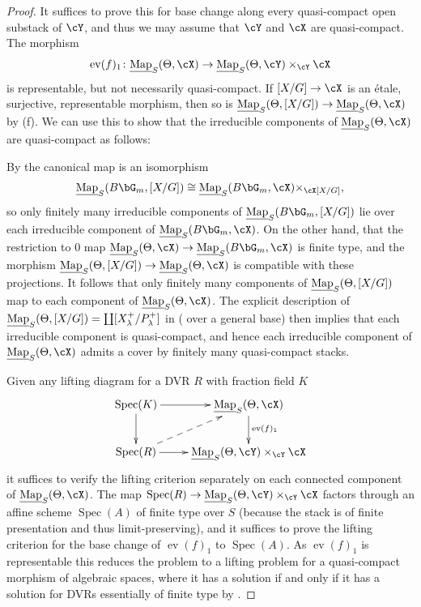 \documentclass[a4paper]{amsart}
\numberwithin{equation}{section}
\theoremstyle{plain}
\theoremstyle{definition}
\DeclareMathOperator{\Spec}{Spec}
\DeclareMathOperator{\ev}{ev}
\newcommand{\uMap}{\underline{{\rm Map}}}
\begin{document}
\begin{proof}
It suffices to prove this for base change along every quasi-compact open substack of $\cY$, and thus we may assume that $\cY$ and $\cX$ are quasi-compact. The morphism $$\ev(f)_1 \colon \uMap_S(\Theta,\cX) \to \uMap_S(\Theta,\cY) \times_{\cY} \cX$$ is representable, but not necessarily quasi-compact. If $[X/G] \to \cX$ is an \'etale, surjective, representable morphism, then so is $\uMap_S(\Theta,[X/G]) \to \uMap_S(\Theta,\cX)$ by (f). We can use this to show that the irreducible components of $\uMap_S(\Theta,\cX)$ are quasi-compact as follows:

By \cite[Cor.~1.1.7]{hlinstability} the canonical map is an isomorphism
\[
\uMap_S(B\bG_m,[X/G]) \cong \uMap_S(B\bG_m,\cX) \times_\cX [X/G],
\]
so only finitely many irreducible components of $\uMap_S(B\bG_m,[X/G])$ lie over each irreducible component of $\uMap_S(B\bG_m,\cX)$. On the other hand, \cite[Lem.~1.3.8]{hlinstability} that the restriction to $0$ map $\uMap_S(\Theta,\cX) \to \uMap_S(B\bG_m,\cX)$ is finite type, and the morphism $\uMap_S(\Theta,[X/G]) \to \uMap_S(\Theta,\cX)$ is compatible with these projections. It follows that only finitely many components of $\uMap_S(\Theta,[X/G])$ map to each component of $\uMap_S(\Theta,\cX)$. The explicit description of $\uMap_S(\Theta,[X/G])= \coprod [X_\lambda^+/P_{\lambda}^+]$ in  (\cite[Thm.~1.4.7]{hlinstability} over a general base) then implies that each irreducible component is quasi-compact, and hence each irreducible component of $\uMap_S(\Theta,\cX)$ admits a cover by finitely many quasi-compact stacks.

Given any lifting diagram for a DVR $R$ with fraction field $K$
	$$\xymatrix{
		\Spec(K) \ar[d] \ar[r] &  \uMap_S(\Theta,\cX) \ar[d]^{\ev(f)_1} \\ \Spec(R) \ar@{-->}[ur] \ar[r] & \uMap_S(\Theta,\cY) \times_{\cY} \cX
	}$$
it suffices to verify the lifting criterion separately on each connected component of $\uMap_S(\Theta,\cX)$. The map $\Spec(R) \to \uMap_S(\Theta,\cY) \times_{\cY} \cX$ factors through an affine scheme $\Spec(A)$ of finite type over $S$ (because the stack is of finite presentation and thus limit-preserving), and it suffices to prove the lifting criterion for the base change of $\ev(f)_1$ to $\Spec(A)$. As $\ev(f)_1$ is representable this reduces the problem to a lifting problem for a quasi-compact morphism of algebraic spaces, where it has a solution if and only if it has a solution for DVRs essentially of finite type by .

\end{proof}
\end{document}
